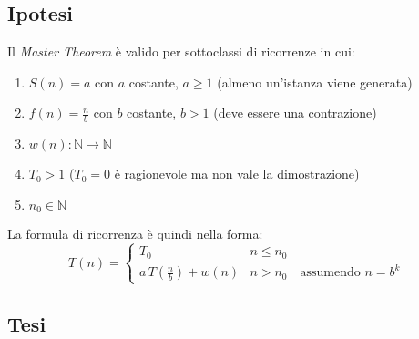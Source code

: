 \subsection{Ipotesi}
Il \textit{Master Theorem} è valido per sottoclassi di ricorrenze in cui:
\begin{enumerate}
    \item $S(n) = a$ con $a$ costante, $a \geq 1$ (almeno un'istanza viene generata)
    \item $f(n) = \frac{n}{b}$ con $b$ costante, $b > 1$ (deve essere una contrazione)
    \item $w(n): \mathbb{N} \rightarrow \mathbb{N}$%
    \item $T_0 > 1$ ($ T_0 = 0$ è ragionevole ma non vale la dimostrazione)
    \item $n_0 \in \mathbb{N}$
\end{enumerate}
La formula di ricorrenza è quindi nella forma:
\begin{equation}
    T(n) = 
    \begin{cases} 
        T_0      &  n \leq n_0 \\
        a \, T\left( \frac{n}{b} \right) + w(n) & n > n_0 \quad \text{assumendo } n=b^k
    \end{cases}
    \label{eq:masterricorrenza1}
\end{equation}

\subsection{Tesi}

